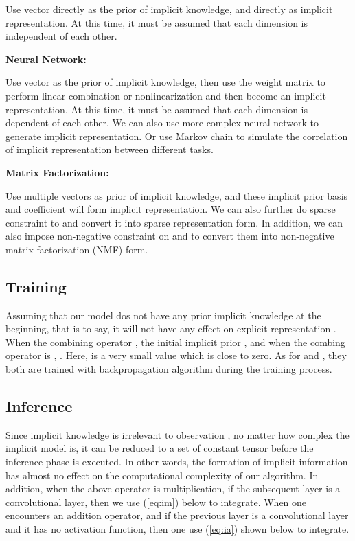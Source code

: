 \documentclass[10pt,twocolumn,letterpaper]{article}
\begin{document}
Use vector  directly as the prior of implicit knowledge, and directly as implicit representation. At this time, it must be assumed that each dimension is independent of each other.

\noindent
\textbf{Neural Network:}



Use vector  as the prior of implicit knowledge, then use the weight matrix  to perform linear combination or nonlinearization and then become an implicit representation. At this time, it must be assumed that each dimension is dependent of each other. We can also use more complex neural network to generate implicit representation. Or use Markov chain to simulate the correlation of implicit representation between different tasks. 

\noindent
\textbf{Matrix Factorization:}



Use multiple vectors as prior of implicit knowledge, and these implicit prior basis  and coefficient  will form implicit representation. We can also further do sparse constraint to  and convert it into sparse representation form. In addition, we can also impose non-negative constraint on  and  to convert them into non-negative matrix factorization (NMF) form.

\newpage

\subsection{Training}

Assuming that our model dos not have any prior implicit knowledge at the beginning, that is to say, it will not have any effect on explicit representation . When the combining operator , the initial implicit prior  , and when  the combing operator  is , . Here,  is a very small value which is close to zero. As for  and , they both are trained with backpropagation algorithm during the training process.

\subsection{Inference}

Since implicit knowledge is irrelevant to observation , no matter how complex the implicit model  is, it can be reduced to a set of constant tensor before the inference phase is executed. In other words, the formation of implicit information has almost no effect on the computational complexity of our algorithm. In addition, when the above operator is multiplication, if the subsequent layer is a convolutional layer, then we use (\ref{eq:im}) below to integrate. When one encounters an addition operator, and if the previous layer is a convolutional layer and it has no activation function, then one use (\ref{eq:ia}) shown below to integrate.
\end{document}

